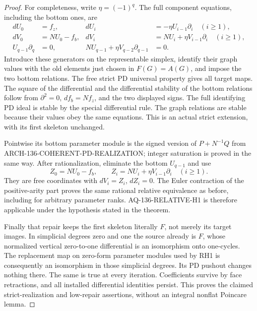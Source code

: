 \begin{proof}
For completeness, write \(\eta=(-1)^q\). The full component
equations, including the bottom ones, are
\[
 \begin{aligned}
 dU_0&=f_z,&dU_i&=-\eta U_{i-1}\partial_i\quad(i\geq1),\\
 dV_0&=NU_0-f_b,&dV_i&=NU_i+\eta V_{i-1}\partial_i
                                                   \quad(i\geq1),\\
 U_{q-1}\partial_q&=0,&
 NU_{q-1}+\eta V_{q-2}\partial_{q-1}&=0.
 \end{aligned}                                             \tag{136.CG9}
\]
Introduce these generators on the representable simplex,
identify their graph values with the old elements just chosen
in \(F(G)=A(G)\), and impose the two bottom relations.
The free strict PD universal property gives all target maps.
The square of the differential and the differential stability
of the bottom relations follow from \(\partial^2=0\),
\(df_b=Nf_z\), and the two displayed signs. The full
identifying PD ideal is stable by the special differential
rule. The graph relations are stable because their values
obey the same equations. This is an actual strict extension,
with its first skeleton unchanged.

Pointwise its bottom parameter module is the signed version
of \(P+N^{-1}Q\) from ARCH-136-COHERENT-PD-REALIZATION;
integer saturation is proved in the same way. After
rationalization, eliminate the bottom \(U_{q-1}\) and use
\[
 Z_0=NU_0-f_b,\qquad
 Z_i=NU_i+\eta V_{i-1}\partial_i\quad(i\geq1).
\]
They are free coordinates with \(dV_i=Z_i\), \(dZ_i=0\).
The Euler contraction of the positive-arity part proves the
same rational relative equivalence as before, including for
arbitrary parameter ranks. AQ-136-RELATIVE-H1 is therefore
applicable under the hypothesis stated in the theorem.

Finally that repair keeps the first skeleton literally \(F\),
not merely its target images. In simplicial degrees zero and
one the source already is \(F\), whose normalized vertical
zero-to-one differential is an isomorphism onto one-cycles.
The replacement map on zero-form parameter modules used by
RH1 is consequently an isomorphism in those simplicial degrees.
Its PD pushout changes nothing there. The same is true at
every iteration. Coefficients survive by face retractions,
and all installed differential identities persist. This proves
the claimed strict-realization and low-repair assertions,
without an integral nonflat Poincare lemma.
\end{proof}

